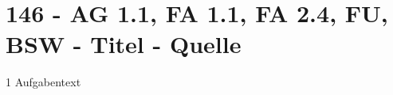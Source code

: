 \section{146 - AG 1.1, FA 1.1, FA 2.4, FU, BSW - Titel - Quelle}

\begin{langesbeispiel}\item[1] %
Aufgabentext

\end{langesbeispiel}
